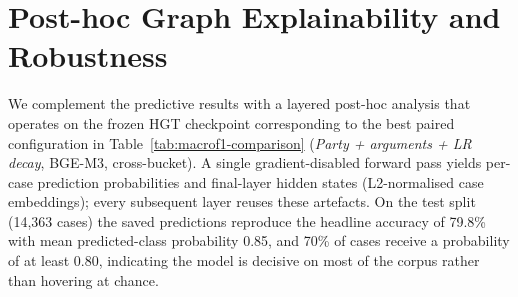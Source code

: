\documentclass[runningheads]{llncs}
\begin{document}


\section{Post-hoc Graph Explainability and Robustness}
\label{sec:explainability}

We complement the predictive results with a layered post-hoc analysis that operates on the frozen HGT checkpoint corresponding to the best paired configuration in Table~\ref{tab:macrof1-comparison} (\emph{Party + arguments + LR decay}, BGE-M3, cross-bucket). A single gradient-disabled forward pass yields per-case prediction probabilities and final-layer hidden states (L2-normalised case embeddings); every subsequent layer reuses these artefacts. On the test split (14{,}363 cases) the saved predictions reproduce the headline accuracy of 79.8\% with mean predicted-class probability 0.85, and 70\% of cases receive a probability of at least 0.80, indicating the model is decisive on most of the corpus rather than hovering at chance.
\end{document}
